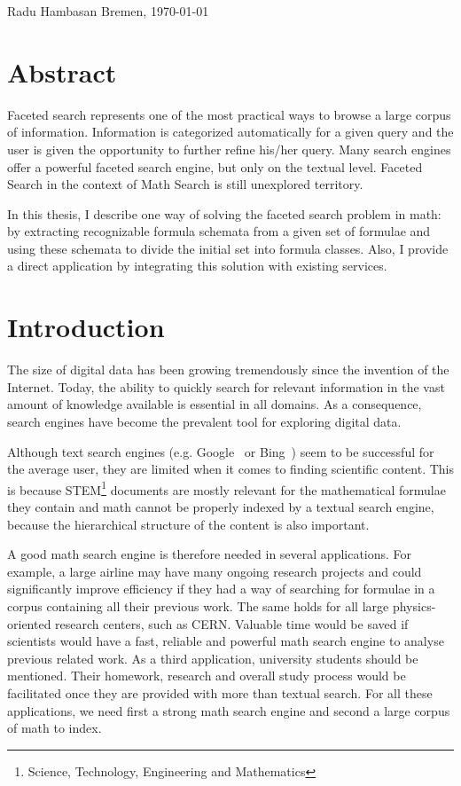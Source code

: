 \documentclass[a4paper,11pt,oneside]{article}
\begin{document}
\vspace{20mm}

Radu Hambasan \hfill Bremen, \today

\newpage

\section*{Abstract}
Faceted search represents one of the most practical ways to browse a large
corpus of information. Information is categorized automatically for
a given query and the user is given the opportunity to further refine
his/her query. Many search engines offer a powerful faceted search engine,
but only on the textual level. Faceted Search in the context of Math Search
is still unexplored territory.

In this thesis, I describe one way of solving the faceted search problem in
math: by extracting recognizable formula schemata from a given set of formulae
and using these schemata to divide the initial set into formula classes. Also,
I provide a direct application by integrating this solution with existing
services.

\tableofcontents

\clearpage {}

\section{Introduction}\label{sec:intro}

The size of digital data has been growing tremendously since the invention
of the Internet. Today, the ability to quickly search for relevant information
in the vast amount of knowledge available is essential in all domains.
As a consequence, search engines have become the prevalent tool for exploring
digital data.

Although text search engines (e.g. Google~\cite{google:online} or
Bing~\cite{bing:online}) seem to be successful for the average user, they are
limited when it comes to finding scientific content. This is because
STEM\footnote{Science, Technology, Engineering and Mathematics} documents are
mostly relevant for the mathematical formulae they contain and math cannot be
properly indexed by a textual search engine, because the hierarchical structure
of the content is also important.

A good math search engine is therefore needed in several applications.
For example, a large airline may have many ongoing research projects and could
significantly improve efficiency if they had a way of searching for formulae in
a corpus containing all their previous work. The same holds for all large
physics-oriented research centers, such as CERN. Valuable time would be saved
if scientists would have a fast, reliable and powerful math search engine to
analyse previous related work. As a third application, university students
should be mentioned. Their homework, research and overall study process would
be facilitated once they are provided with more than textual search. For all
these applications, we need first a strong math search engine and second a
large corpus of math to index.
\end{document}
